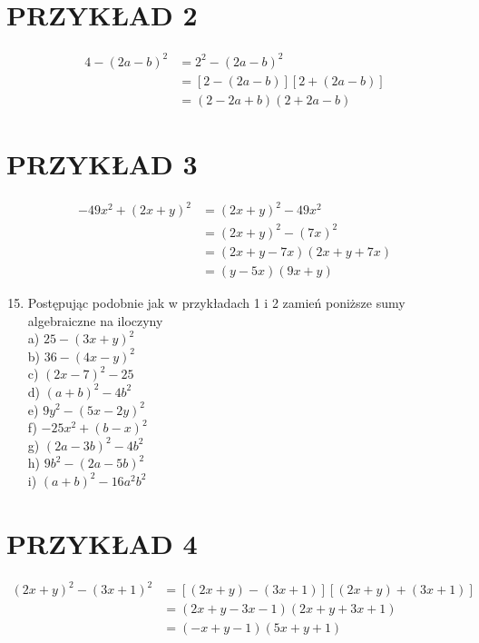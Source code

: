 \documentclass[10pt]{article}
\begin{document}
\section*{PRZYKŁAD 2}
\[
\begin{aligned}
4-(2 a-b)^{2} & =2^{2}-(2 a-b)^{2} \\
& =[2-(2 a-b)][2+(2 a-b)] \\
& =(2-2 a+b)(2+2 a-b)
\end{aligned}
\]

\section*{PRZYKŁAD 3}
\[
\begin{aligned}
-49 x^{2}+(2 x+y)^{2} & =(2 x+y)^{2}-49 x^{2} \\
& =(2 x+y)^{2}-(7 x)^{2} \\
& =(2 x+y-7 x)(2 x+y+7 x) \\
& =(y-5 x)(9 x+y)
\end{aligned}
\]

\begin{enumerate}
  \setcounter{enumi}{14}
  \item Postępując podobnie jak w przykładach 1 i 2 zamień poniższe sumy algebraiczne na iloczyny\\
a) \(25-(3 x+y)^{2}\)\\
b) \(36-(4 x-y)^{2}\)\\
c) \((2 x-7)^{2}-25\)\\
d) \((a+b)^{2}-4 b^{2}\)\\
e) \(9 y^{2}-(5 x-2 y)^{2}\)\\
f) \(-25 x^{2}+(b-x)^{2}\)\\
g) \((2 a-3 b)^{2}-4 b^{2}\)\\
h) \(9 b^{2}-(2 a-5 b)^{2}\)\\
i) \((a+b)^{2}-16 a^{2} b^{2}\)
\end{enumerate}

\section*{PRZYKŁAD 4}
\[
\begin{aligned}
(2 x+y)^{2}-(3 x+1)^{2} & =[(2 x+y)-(3 x+1)][(2 x+y)+(3 x+1)] \\
& =(2 x+y-3 x-1)(2 x+y+3 x+1) \\
& =(-x+y-1)(5 x+y+1)
\end{aligned}
\]
\end{document}
